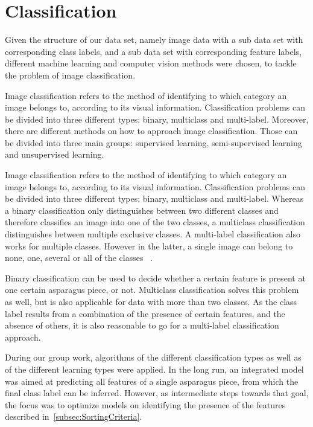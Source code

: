%
\section{Classification}
\label{ch:Classification}

Given the structure of our data set, namely image data with a sub data set with corresponding class labels, and a sub data set with corresponding feature labels, different machine learning and computer vision methods were chosen, to tackle the problem of image classification.

Image classification refers to the method of identifying to which category an image belongs to, according to its visual information. Classification problems can be divided into three different types: binary, multiclass and multi-label. Moreover, there are different methods on how to approach image classification. Those can be divided into three main groups: supervised learning, semi-supervised learning and unsupervised learning. 

Image classification refers to the method of identifying to which category an image belongs to, according to its visual information. Classification problems can be divided into three different types: binary, multiclass and multi-label. Whereas a binary classification only distinguishes between two different classes and therefore classifies an image into one of the two classes, a multiclass classification distinguishes between multiple exclusive classes. A multi-label classification also works for multiple classes. However in the latter, a single image can belong to none, one, several or all of the classes ~\citep{har2003constraint}.

Binary classification can be used to decide whether a certain feature is present at one certain asparagus piece, or not. Multiclass classification solves this problem as well, but is also applicable for data with more than two classes. As the class label results from a combination of the presence of certain features, and the absence of others, it is also reasonable to go for a multi-label classification approach.

\bigskip
During our group work, algorithms of the different classification types as well as of the different learning types were applied.
In the long run, an integrated model was aimed at predicting all features of a single asparagus piece, from which the final class label can be inferred. However, as intermediate steps towards that goal, the focus was to optimize models on identifying the presence of the features described in~\autoref{subsec:SortingCriteria}.

